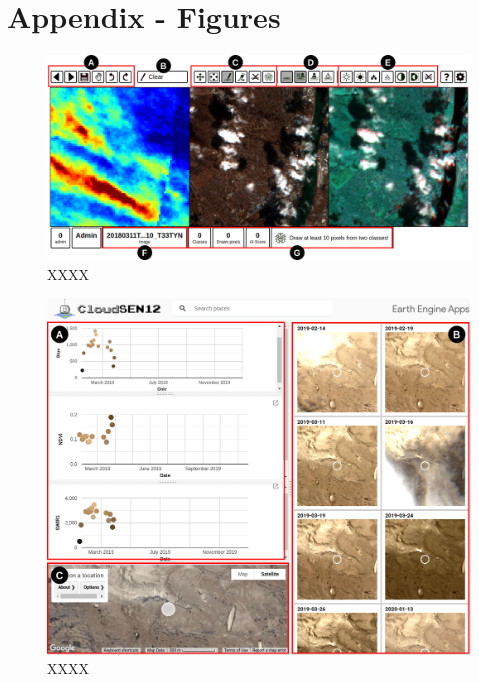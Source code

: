 \documentclass[a4paper, nobind]{templates/cdethesis}
\newcommand*{\bibtitle}{Bibliography}
\begin{document}
\hypertarget{appendix---figures}{%
\chapter{Appendix - Figures}\label{appendix---figures}}

\setcounter{figure}{0}
\makeatletter 
\renewcommand{\thefigure}{S\@arabic\c@figure}
\makeatother

\begin{figure}[!h]
    \centering
    \includegraphics[width=1\linewidth]{figures/extra/figureS2.png}
    \caption{XXXX}
    \label{fig:figureS02}
\end{figure}

\begin{figure}[!h]
    \centering
    \includegraphics[width=1\linewidth]{figures/extra/figureS3.png}
    \caption{XXXX}
    \label{fig:figureS03}
\end{figure}


\setlength{\baselineskip}{0pt} %

{\renewcommand*\MakeUppercase[1]{#1}%
\printbibliography[heading=bibintoc,title={\bibtitle}]}
\end{document}
